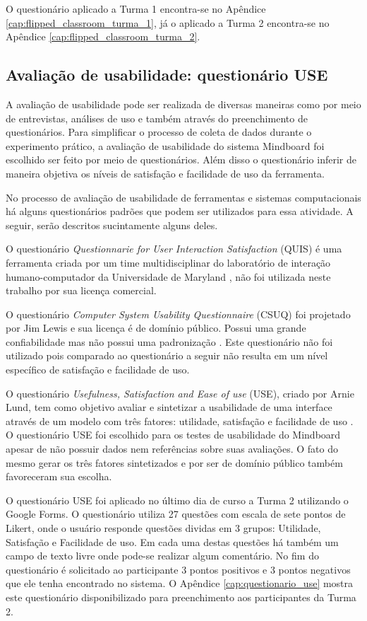 O questionário aplicado a Turma 1 encontra-se no Apêndice \ref{cap:flipped_classroom_turma_1}, já o aplicado a Turma 2 encontra-se no Apêndice \ref{cap:flipped_classroom_turma_2}.

\subsection{Avaliação de usabilidade: questionário USE}
\label{sec:use}

A avaliação de usabilidade pode ser realizada de diversas maneiras como por meio de entrevistas, análises de uso e também através do preenchimento de questionários. Para simplificar o processo de coleta de dados durante o experimento prático, a avaliação de usabilidade do sistema Mindboard foi escolhido ser feito por meio de questionários. Além disso o questionário inferir de maneira objetiva os níveis de satisfação e facilidade de uso da ferramenta.

No processo de avaliação de usabilidade de ferramentas e sistemas computacionais há alguns questionários padrões que podem ser utilizados para essa atividade. A seguir, serão descritos sucintamente alguns deles. 

O questionário \emph{Questionnarie for User Interaction Satisfaction} (QUIS) é uma ferramenta criada por um time multidisciplinar do laboratório de interação humano-computador da Universidade de Maryland \cite{quis}, não foi utilizada neste trabalho por sua licença comercial.

O questionário \emph{Computer System Usability Questionnaire} (CSUQ) foi projetado por Jim Lewis e sua licença é de domínio público. Possui uma grande confiabilidade mas não possui uma padronização \cite{csuq}. Este questionário não foi utilizado pois comparado ao questionário a seguir não resulta em um nível específico de satisfação e facilidade de uso.

O questionário \emph{Usefulness, Satisfaction and Ease of use} (USE), criado por Arnie Lund, tem como objetivo avaliar e sintetizar a usabilidade de uma interface através de um modelo com três fatores: utilidade, satisfação e facilidade de uso \cite{useq}. O questionário USE foi escolhido para os testes de usabilidade do Mindboard apesar de não possuir dados nem referências sobre suas avaliações. O fato do mesmo gerar os três fatores sintetizados e por ser de domínio público também favoreceram sua escolha.

O questionário USE foi aplicado no último dia de curso a Turma 2 utilizando o Google Forms. O questionário utiliza 27 questões com escala de sete pontos de Likert, onde o usuário responde questões dividas em 3 grupos: Utilidade, Satisfação e Facilidade de uso. Em cada uma destas questões há também um campo de texto livre onde pode-se realizar algum comentário. No fim do questionário é solicitado ao participante 3 pontos positivos e 3 pontos negativos que ele tenha encontrado no sistema. O Apêndice \ref{cap:questionario_use} mostra este questionário disponibilizado para preenchimento aos participantes da Turma 2.

